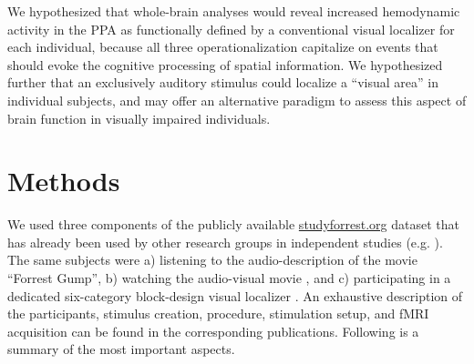 \documentclass[english]{article}
\begin{document}
We hypothesized that whole-brain analyses would reveal increased hemodynamic
activity in the PPA as functionally defined by a
conventional visual localizer for each individual, because all three operationalization capitalize
on events that should evoke the cognitive processing of spatial information.
We hypothesized further that an exclusively auditory stimulus could localize a
``visual area'' in individual subjects,
and may offer an alternative paradigm to assess this aspect of brain function
in visually impaired individuals.



\section{Methods}


We used three components of the publicly available
\href{http://www.studyforrest.org}{studyforrest.org} dataset that has already
been used by other research groups in independent studies (e.g.
\citep{ben2018hippocampal, jiahui2019predicting, hu2017decoding,
lettieri2019emotionotopy, nguyen2016integration}).
The same subjects were
a) listening to the audio-description \citep{hanke2014audiomovie} of
the movie ``Forrest Gump'',
b) watching the audio-visual movie \citep{hanke2016simultaneous}, and
c) participating in a dedicated six-category block-design visual localizer \citep{sengupta2016extension}.
An exhaustive description of the participants, stimulus creation, procedure,
stimulation setup, and fMRI acquisition can be found in the corresponding
publications. Following is a summary of the most important aspects.
\end{document}

